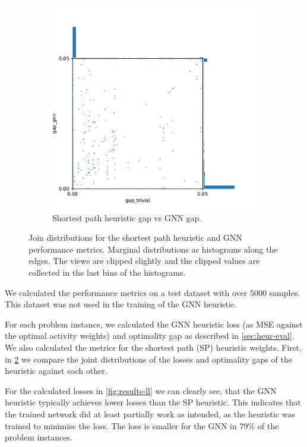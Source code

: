 \documentclass[english, 12pt, a4paper, sci, utf8, a-2b, online]{aaltothesis}
\begin{document}
\begin{figure}
\begin{subfigure}{0.5\textwidth}
        \includegraphics[width=\linewidth]{figures/gap-gap.pdf}
        \caption{Shortest path heuristic gap vs GNN gap.}
        \label{fig:results-gg}
    \end{subfigure}
    \caption{Join distributions for the shortest path heuristic and GNN performance metrics. Marginal distributions as histograms along the edges. The views are clipped slightly and the clipped values are collected in the last bins of the histograms.}
    \label{fig:results-ll-gg}
\end{figure}

We calculated the performance metrics on a test dataset with over 5000 samples. This dataset was not used in the training of the GNN heuristic.

For each problem instance, we calculated the GNN heuristic loss (as MSE against the optimal activity weights) and optimality gap as described in \cref{sec:heur-eval}. We also calculated the metrics for the shortest path (SP) heuristic weights. First, in \cref{fig:results-ll-gg} we compare the joint distributions of the losses and optimality gaps of the heuristic against each other.

For the calculated losses in \cref{fig:results-ll} we can clearly see, that the GNN heuristic typically achieves lower losses than the SP heuristic. This indicates that the trained network did at least partially work as intended, as the heuristic was trained to minimise the loss. The loss is smaller for the GNN in 79\% of the problem instances.
\end{document}
